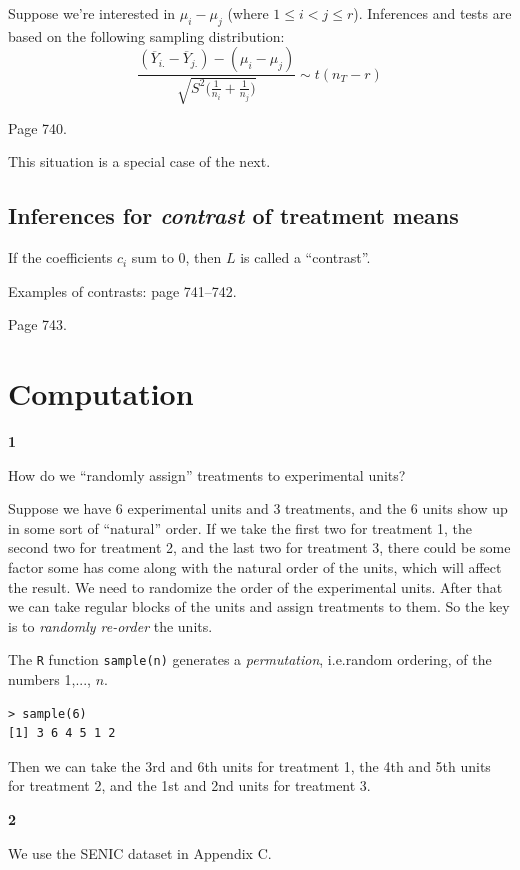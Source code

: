 \documentclass[12pt]{article}
\begin{document}
Suppose we're interested in $\mu_i - \mu_j$ (where $1 \le i < j \le r$).
Inferences and tests are based on the following sampling distribution:
\[
\frac{(\overline{Y}_{i.} - \overline{Y}_{j.}) - (\mu_i - \mu_j)}
    {\sqrt{S^2\bigl(\frac{1}{n_i} + \frac{1}{n_j}\bigr)}}
\sim t(n_T - r)
\]

\example
Page 740.

This situation is a special case of the next.

\subsection*{Inferences for \emph{contrast} of treatment means}

If the coefficients $c_i$ sum to 0,
then $L$ is called a ``contrast''.

Examples of contrasts: page 741--742.

\example
Page 743.

\section{Computation}

\textbf{1}

How do we ``randomly assign'' treatments to experimental units?

Suppose we have 6 experimental units and 3 treatments,
and the 6 units show up in some sort of ``natural'' order.
If we take the first two for treatment 1,
the second two for treatment 2,
and the last two for treatment 3,
there could be some factor some has come along with
the natural order of the units, which will affect the result.
We need to randomize the order of the experimental units.
After that we can take regular blocks of the units
and assign treatments to them.
So the key is to \emph{randomly re-order} the units.

The \verb+R+ function \verb+sample(n)+
generates a \emph{permutation},
i.e.\@ random ordering, of the numbers 1,..., $n$.
\begin{verbatim}
> sample(6)
[1] 3 6 4 5 1 2
\end{verbatim}
Then we can take the
3rd and 6th units for treatment 1,
the 4th and 5th units for treatment 2,
and the 1st and 2nd units for treatment 3.


\textbf{2}

We use the SENIC dataset in Appendix C.
\end{document}
